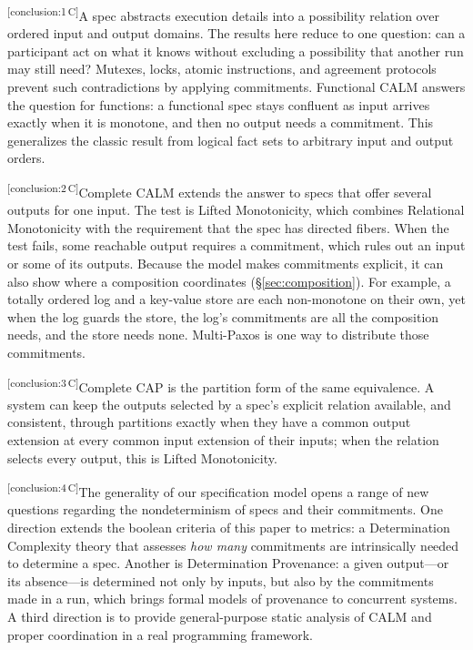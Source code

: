 \documentclass[sigconf]{cidr-2027}
\theoremstyle{remark}
\newcommand{\commitment}{commitment\xspace}
\newcommand{\commitments}{commitments\xspace}
\newcommand{\indesc}{input extension\xspace} %
\newcommand{\outnoun}{output extension\xspace}%
\newcommand{\cxtag}[2]{\textsuperscript{\textsf{\tiny[#1\,#2]}}}
\begin{document}
\color{black!45}\cxtag{conclusion:1}{C}A spec abstracts execution details into a possibility relation over
ordered input and output domains.
The results here reduce to one question: can a participant act on what it knows
without excluding a possibility that another run may still need?  Mutexes,
locks, atomic instructions, and agreement protocols prevent such contradictions
by applying \commitments.
Functional CALM answers the question for functions: a functional spec
stays confluent as input arrives exactly when it is monotone, and then no
output needs a \commitment.  This generalizes the classic result from logical fact
sets to arbitrary input and output orders.\color{black}

\color{black!45}\cxtag{conclusion:2}{C}Complete CALM extends the answer to specs that offer several outputs
for one input.  The test is Lifted Monotonicity, which combines Relational
Monotonicity with the requirement that the spec has directed fibers.  When the test fails, some reachable output
requires a \commitment, which rules out an input or some of its outputs.
Because the model makes \commitments explicit, it can also show where a
composition coordinates (\S\ref{sec:composition}).  For example, a totally ordered log
and a key-value store are each non-monotone on their own, yet when the log
guards the store, the log's \commitments are all the composition needs, and
the store needs none.  Multi-Paxos is one way to distribute those
\commitments.\color{black}

\color{black!45}\cxtag{conclusion:3}{C}Complete CAP is the partition form of the same equivalence.  A system can keep
the outputs selected by a spec's explicit relation available, and
consistent, through partitions exactly when they have a common \outnoun at
every common \indesc of their inputs; when the relation selects every output,
this is Lifted Monotonicity.\color{black}

\color{black!45}\cxtag{conclusion:4}{C}The generality of our specification model opens a range of new questions
regarding the nondeterminism of specs and their \commitments. One direction
extends the boolean criteria of this paper to metrics: a Determination
Complexity theory that assesses \emph{how many} \commitments are intrinsically
needed to determine a spec. Another is Determination Provenance: a
given output---or its absence---is determined not only by inputs, but also by
the \commitments made in a run, which brings formal models of provenance to
concurrent systems. A third direction is to provide general-purpose static
analysis of CALM and proper coordination in a real programming framework.\color{black}
\end{document}
